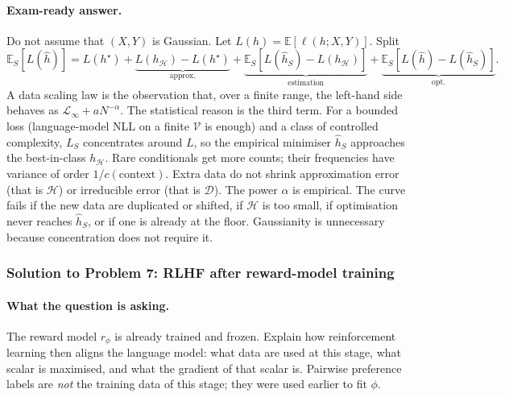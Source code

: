 \documentclass[11pt,a4paper]{article}
\theoremstyle{definition}
\begin{document}
\paragraph{Exam-ready answer.}
Do not assume that \((X,Y)\) is Gaussian. Let \(L(h)=\mathbb{E}[\ell(h;X,Y)]\). Split
\[
\mathbb{E}_S[L(\widehat h)]
=L(h^\star)+\underbrace{L(h_{\mathcal{H}})-L(h^\star)}_{\text{approx.}}
+\underbrace{\mathbb{E}_S[L(\widehat h_S)-L(h_{\mathcal{H}})]}_{\text{estimation}}
+\underbrace{\mathbb{E}_S[L(\widehat h)-L(\widehat h_S)]}_{\text{opt.}}.
\]
A data scaling law is the observation that, over a finite range, the left-hand side behaves as \(\mathcal{L}_\infty+aN^{-\alpha}\). The statistical reason is the third term. For a bounded loss (language-model NLL on a finite \(\mathcal{V}\) is enough) and a class of controlled complexity, \(L_S\) concentrates around \(L\), so the empirical minimiser \(\widehat h_S\) approaches the best-in-class \(h_{\mathcal{H}}\). Rare conditionals get more counts; their frequencies have variance of order \(1/c(\text{context})\). Extra data do not shrink approximation error (that is \(\mathcal{H}\)) or irreducible error (that is \(\mathcal{D}\)). The power \(\alpha\) is empirical. The curve fails if the new data are duplicated or shifted, if \(\mathcal{H}\) is too small, if optimisation never reaches \(\widehat h_S\), or if one is already at the floor. Gaussianity is unnecessary because concentration does not require it.

\subsubsection{Solution to Problem 7: RLHF after reward-model training}
\label{sol:spr2026-rlhf}

\paragraph{What the question is asking.}
The reward model \(r_\phi\) is already trained and frozen. Explain how reinforcement learning then aligns the language model: what data are used at this stage, what scalar is maximised, and what the gradient of that scalar is. Pairwise preference labels are \emph{not} the training data of this stage; they were used earlier to fit \(\phi\).
\end{document}
